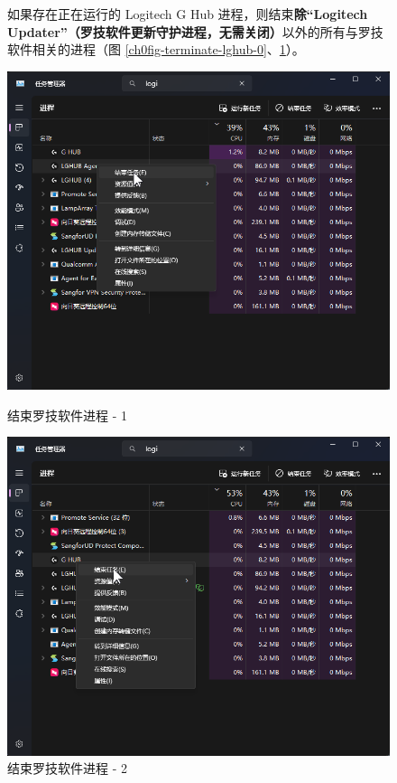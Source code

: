 \begin{figure}[H]
    \Centering
    \parbox[l]{\textwidth}{如果存在正在运行的 Logitech G Hub 进程，则结束\textbf{\color{red}除“Logitech Updater”（罗技软件更新守护进程，无需关闭）}以外的所有与罗技软件相关的进程（图 \ref{ch0fig-terminate-lghub-0}、\ref{ch0fig-terminate-lghub-1}）。}
    \includegraphics[width=\textwidth]{docs/assets/intro/terminate_lghub_00.png}
    \caption{结束罗技软件进程 - 1}
    \label{ch0fig-terminate-lghub-0}
    \includegraphics[width=\textwidth]{docs/assets/intro/terminate_lghub_01.png}
    \caption{结束罗技软件进程 - 2}
    \label{ch0fig-terminate-lghub-1}
\end{figure}

